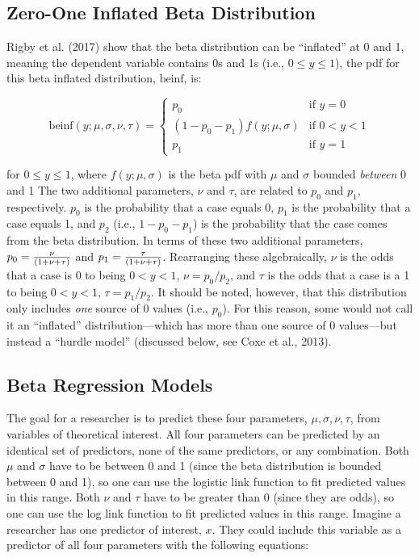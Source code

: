 \documentclass[english,man]{apa6}
\theoremstyle{definition}
\theoremstyle{definition}
\theoremstyle{remark}
\begin{document}
\subsection{Zero-One Inflated Beta
Distribution}\label{zero-one-inflated-beta-distribution}

Rigby et al. (2017) show that the beta distribution can be
\enquote{inflated} at 0 and 1, meaning the dependent variable contains
0s and 1s (i.e., \(0 \leq y \leq 1\)), the pdf for this beta inflated
distribution, \(\text{beinf}\), is:

\begin{center}
\[
\text{beinf}(y;\mu,\sigma,\nu,\tau) =
\begin{cases}
  p_0                             & \text{if } y = 0\\
  (1 - p_0 - p_1)f(y;\mu,\sigma)  & \text{if } 0 < y < 1\\
  p_1                             & \text{if } y = 1
\end{cases}
\]
\end{center}

for \(0 \leq y \leq 1\), where \(f(y;\mu,\sigma)\) is the beta pdf with
\(\mu\) and \(\sigma\) bounded \emph{between} 0 and 1 The two additional
parameters, \(\nu\) and \(\tau\), are related to \(p_0\) and \(p_1\),
respectively. \(p_0\) is the probability that a case equals 0, \(p_1\)
is the probability that a case equals 1, and \(p_2\) (i.e.,
\(1 - p_0 - p_1\)) is the probability that the case comes from the beta
distribution. In terms of these two additional parameters,
\(p_0 = {\nu \over (1 + \nu + \tau)}\) and
\(p_1 = {\tau \over (1 + \nu + \tau)}\). Rearranging these
algebraically, \(\nu\) is the odds that a case is 0 to being
\(0 < y < 1\), \(\nu = p_0 / p_2\), and \(\tau\) is the odds that a case
is a 1 to being \(0 < y < 1\), \(\tau = p_1 / p_2\). It should be noted,
however, that this distribution only includes \emph{one} source of 0
values (i.e., \(p_0\)). For this reason, some would not call it an
\enquote{inflated} distribution---which has more than one source of 0
values---but instead a \enquote{hurdle model} (discussed below, see Coxe
et al., 2013).

\subsection{Beta Regression Models}\label{beta-regression-models}

The goal for a researcher is to predict these four parameters,
\(\mu, \sigma, \nu, \tau\), from variables of theoretical interest. All
four parameters can be predicted by an identical set of predictors, none
of the same predictors, or any combination. Both \(\mu\) and \(\sigma\)
have to be between 0 and 1 (since the beta distribution is bounded
between 0 and 1), so one can use the logistic link function to fit
predicted values in this range. Both \(\nu\) and \(\tau\) have to be
greater than 0 (since they are odds), so one can use the log link
function to fit predicted values in this range. Imagine a researcher has
one predictor of interest, \(x\). They could include this variable as a
predictor of all four parameters with the following equations:
\end{document}
